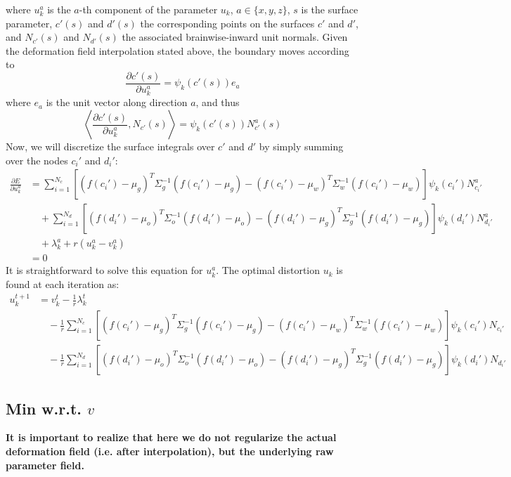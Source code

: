 \documentclass[a4paper,12pt]{article}
\begin{document}
where $u_k^a$ is the $a$-th component of the parameter $u_k$, $a\in \{x,y,z\}$, $s$ is the surface parameter, $c'(s)$ and $d'(s)$ the corresponding points on the surfaces $c'$ and $d'$, and $N_{c'}(s)$ and $N_{d'}(s)$ the associated brainwise-inward unit normals.
Given the deformation field interpolation stated above, the boundary moves according to
\begin{equation}
\frac{\partial c'(s)}{\partial u_k^a} = \psi_k(c'(s))e_a
\end{equation}
where $e_a$ is the unit vector along direction $a$, and thus
\begin{equation}
\left\langle\frac{\partial c'(s)}{\partial u_k^a}, N_{c'}(s)\right\rangle = \psi_k(c'(s))N_{c'}^a(s)
\end{equation}
Now, we will discretize the surface integrals over $c'$ and $d'$ by simply summing over the nodes $c_i'$ and $d_i'$:
\begin{align}
\frac{\partial E}{\partial u_k^a} &= \sum_{i=1}^{N_c} \left[(f(c_i')-\mu_g)^T\Sigma_g^{-1}(f(c_i')-\mu_g) - (f(c_i')-\mu_w)^T\Sigma_w^{-1}(f(c_i')-\mu_w)\right]\psi_k(c_i')N_{c_i'}^a \nonumber\\
&\quad + \sum_{i=1}^{N_d} \left[(f(d_i')-\mu_o)^T\Sigma_o^{-1}(f(d_i')-\mu_o) - (f(d_i')-\mu_g)^T\Sigma_g^{-1}(f(d_i')-\mu_g)\right]\psi_k(d_i')N_{d_i'}^a \\
&\quad + \lambda_k^a + r(u_k^a - v_k^a)\nonumber\\
& = 0\nonumber
\end{align}
It is straightforward to solve this equation for $u_k^a$. The optimal distortion $u_k$ is found at each iteration as:
\begin{align}
u_k^{t+1} &= v_k^t - \frac{1}{r}\lambda_k^{t}\nonumber\\
&\quad - \frac{1}{r}\sum_{i=1}^{N_c} \left[(f(c_i')-\mu_g)^T\Sigma_g^{-1}(f(c_i')-\mu_g) - (f(c_i')-\mu_w)^T\Sigma_w^{-1}(f(c_i')-\mu_w)\right]\psi_k(c_i')N_{c_i'}\\
&\quad - \frac{1}{r}\sum_{i=1}^{N_d} \left[(f(d_i')-\mu_o)^T\Sigma_o^{-1}(f(d_i')-\mu_o) - (f(d_i')-\mu_g)^T\Sigma_g^{-1}(f(d_i')-\mu_g)\right]\psi_k(d_i')N_{d_i'}\nonumber
\end{align}

\subsection{Min w.r.t. $v$}

\textbf{It is important to realize that here we do not regularize the actual deformation field (i.e. after interpolation), but the underlying raw parameter field. }
\end{document}
